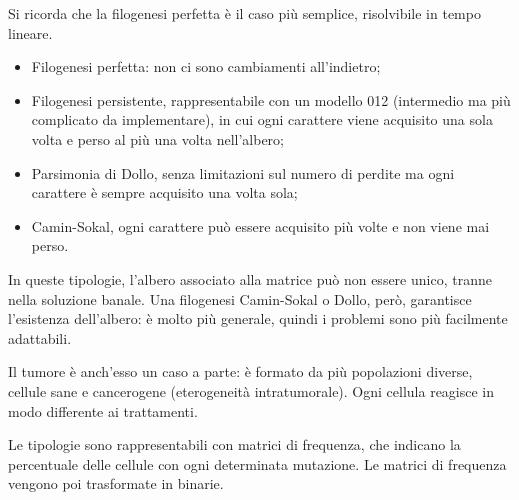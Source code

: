 Si ricorda che la filogenesi perfetta è il caso più semplice, risolvibile in tempo lineare. 

\begin{itemize}
	\item Filogenesi perfetta: non ci sono cambiamenti all'indietro;
	\item Filogenesi persistente, rappresentabile con un modello 012 (intermedio ma più complicato da implementare), in cui ogni carattere viene acquisito una sola volta e perso al più una volta nell'albero;
	\item Parsimonia di Dollo, senza limitazioni sul numero di perdite ma ogni carattere è sempre acquisito una volta sola;
	\item Camin-Sokal, ogni carattere può essere acquisito più volte e non viene mai perso.
\end{itemize}

In queste tipologie, l'albero associato alla matrice può non essere unico, tranne nella soluzione banale. Una filogenesi Camin-Sokal o Dollo, però, garantisce l'esistenza dell'albero: è molto più generale, quindi i problemi sono più facilmente adattabili.

Il tumore è anch'esso un caso a parte: è formato da più popolazioni diverse, cellule sane e cancerogene (eterogeneità intratumorale). Ogni cellula reagisce in modo differente ai trattamenti.

Le tipologie sono rappresentabili con matrici di frequenza, che indicano la percentuale delle cellule con ogni determinata mutazione. Le matrici di frequenza vengono poi trasformate in binarie.